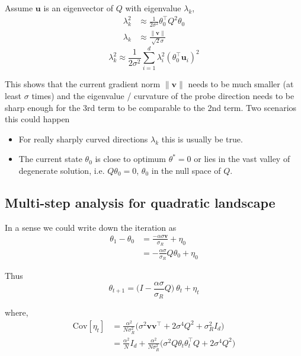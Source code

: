     Assume $\mathbf{u}$ is an eigenvector of $Q$ with eigenvalue $\lambda_{k}$,
    \begin{align*}
    \lambda_{k}^{2} & \approx\frac{1}{2\sigma^{2}}\theta_{0}^{\top}Q^{2}\theta_{0}\\
    \lambda_{k} & \approx\frac{\|\mathbf{v}\|}{\sqrt{2}\sigma}
    \end{align*}
    \[
    \lambda_{k}^{2}\approx\frac{1}{2\sigma^{2}}\sum_{i=1}^{d}\lambda_{i}^{2}(\theta_{0}^{\top}\mathbf{u}_{i})^{2}
    \]
    
    This shows that the current gradient norm $\|\mathbf{v}\|$ needs
    to be much smaller (at least $\sigma$ times) and the eigenvalue /
    curvature of the probe direction needs to be sharp enough for the
    3rd term to be comparable to the 2nd term. Two scenarios this could
    happen 
    \begin{itemize}
    \item For really sharply curved directions $\lambda_{k}$ this is usually
    be true. 
    \item The current state $\theta_{0}$ is close to optimum $\theta^{*}=0$
    or lies in the vast valley of degenerate solution, i.e. $Q\theta_{0}=0$,
    $\theta_{0}$ in the null space of $Q$. 
    \end{itemize}
    
    \subsection{Multi-step analysis for quadratic landscape}\label{appsec:quad_landscape_dynamics}
    
    In a sense we could write down the iteration as 
    \begin{align*}
    \theta_{1}-\theta_{0} & =\frac{-\alpha\sigma\mathbf{v}}{\sigma_{R}}+\eta_{0}\\
     & =-\frac{\alpha\sigma}{\sigma_{R}}Q\theta_{0}+\eta_{0}
    \end{align*}
    
    Thus
    \[
    \theta_{t+1}=\Big(I-\frac{\alpha\sigma}{\sigma_{R}}Q\Big)\ \theta_{t}+\eta_{t}
    \]
    
    where, 
    \begin{align*}
    \mathrm{Cov}[\eta_{t}] & =\frac{\alpha^{2}}{N\sigma_{R}^{2}}\Big(\sigma^{2}\mathbf{v}\mathbf{v}^{\top}+2\sigma^{4}Q^{2}+\sigma_{R}^{2}I_{d}\Big)\\
     & =\frac{\alpha^{2}}{N}I_{d}+\frac{\alpha^{2}}{N\sigma_{R}^{2}}\Big(\sigma^{2}Q\theta_{t}\theta_{t}^{\top}Q+2\sigma^{4}Q^{2}\Big)
    \end{align*} 
    
